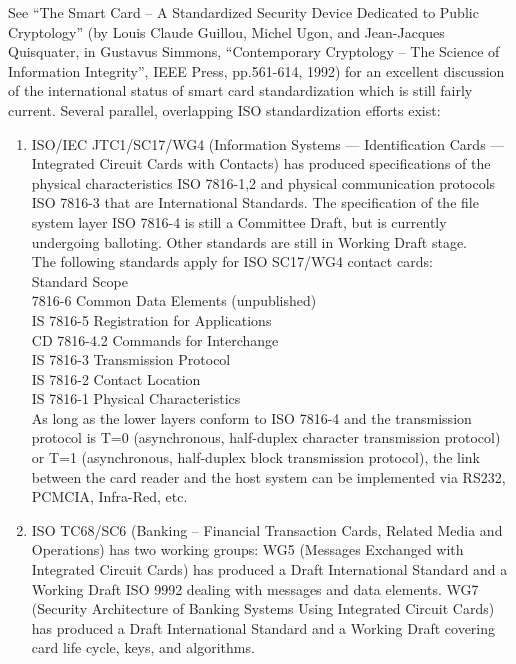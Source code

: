 See ``The Smart Card -- A Standardized Security Device Dedicated to
Public Cryptology'' (by Louis Claude Guillou, Michel Ugon, and
Jean-Jacques Quisquater, in Gustavus Simmons, ``Contemporary Cryptology
-- The Science of Information Integrity'', IEEE Press, pp.561-614,
1992) for an excellent discussion of the international status of smart
card standardization which is still fairly current. Several parallel,
overlapping ISO standardization efforts exist:
\begin{enumerate}
  \item ISO/IEC JTC1/SC17/WG4 (Information Systems --- Identification Cards
--- Integrated Circuit Cards with Contacts) has produced specifications of
the physical characteristics ISO 7816-1,2 and physical communication
protocols ISO 7816-3 that are International Standards. The specification of
the file system layer ISO 7816-4 is still a Committee Draft, but is
currently undergoing balloting. Other standards are still in Working Draft
stage.\\

The following standards apply for ISO SC17/WG4 contact cards:\\

Standard        Scope\\

7816-6          Common Data Elements (unpublished)\\

IS 7816-5       Registration for Applications\\

CD 7816-4.2     Commands for Interchange\\

IS 7816-3       Transmission Protocol\\

IS 7816-2       Contact Location\\

IS 7816-1       Physical Characteristics\\

As long as the lower layers conform to ISO 7816-4 and the transmission
protocol is T=0 (asynchronous, half-duplex character transmission
protocol) or T=1 (asynchronous, half-duplex block transmission
protocol), the link between the card reader and the host system can be
implemented via RS232, PCMCIA, Infra-Red, etc.

  \item ISO TC68/SC6 (Banking -- Financial Transaction Cards, Related
Media and Operations) has two working groups: WG5 (Messages Exchanged
with Integrated Circuit Cards) has produced a Draft International
Standard and a Working Draft ISO 9992 dealing with messages and data
elements. WG7 (Security Architecture of Banking Systems Using
Integrated Circuit Cards) has produced a Draft International Standard
and a Working Draft covering card life cycle, keys, and algorithms.


\end{enumerate}
